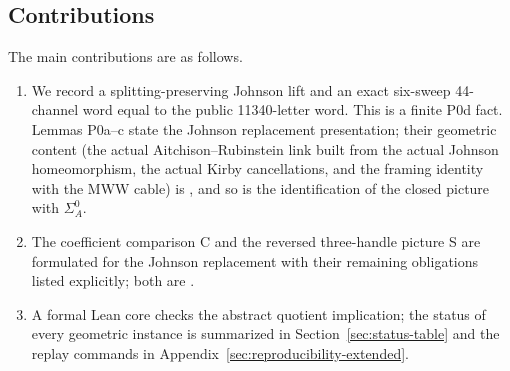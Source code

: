 \subsection*{Contributions}

The main contributions are as follows.
\begin{enumerate}
\item We record a splitting-preserving Johnson lift and an exact
six-sweep 44-channel word equal to the public 11340-letter word.  This is a
finite P0d fact.  Lemmas P0a--c state the Johnson replacement presentation;
their geometric content (the actual Aitchison--Rubinstein link built from
the actual Johnson homeomorphism, the actual Kirby cancellations, and the
framing identity with the MWW cable) is \Open, and so is the identification
of the closed picture with \(\Sigma_A^0\).
\item The coefficient comparison C and the reversed three-handle picture S
are formulated for the Johnson replacement with their remaining obligations
listed explicitly; both are \Open.
\item A formal Lean core checks the abstract quotient implication; the
status of every geometric instance is summarized in
Section~\ref{sec:status-table} and the replay commands in
Appendix~\ref{sec:reproducibility-extended}.
\end{enumerate}

